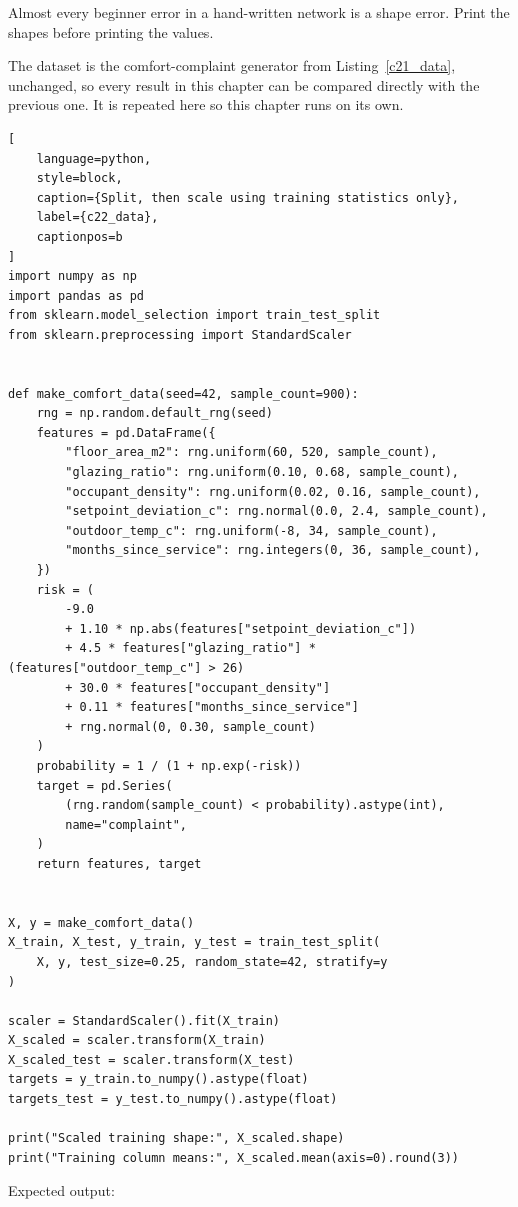 Almost every beginner error in a hand-written network is a shape error. Print the
shapes before printing the values.


The dataset is the comfort-complaint generator from
Listing~\ref{c21_data}, unchanged, so every result in this chapter can be
compared directly with the previous one. It is repeated here so this chapter
runs on its own.

\begin{lstlisting}[
    language=python,
    style=block,
    caption={Split, then scale using training statistics only},
    label={c22_data},
    captionpos=b
]
import numpy as np
import pandas as pd
from sklearn.model_selection import train_test_split
from sklearn.preprocessing import StandardScaler


def make_comfort_data(seed=42, sample_count=900):
    rng = np.random.default_rng(seed)
    features = pd.DataFrame({
        "floor_area_m2": rng.uniform(60, 520, sample_count),
        "glazing_ratio": rng.uniform(0.10, 0.68, sample_count),
        "occupant_density": rng.uniform(0.02, 0.16, sample_count),
        "setpoint_deviation_c": rng.normal(0.0, 2.4, sample_count),
        "outdoor_temp_c": rng.uniform(-8, 34, sample_count),
        "months_since_service": rng.integers(0, 36, sample_count),
    })
    risk = (
        -9.0
        + 1.10 * np.abs(features["setpoint_deviation_c"])
        + 4.5 * features["glazing_ratio"] * (features["outdoor_temp_c"] > 26)
        + 30.0 * features["occupant_density"]
        + 0.11 * features["months_since_service"]
        + rng.normal(0, 0.30, sample_count)
    )
    probability = 1 / (1 + np.exp(-risk))
    target = pd.Series(
        (rng.random(sample_count) < probability).astype(int),
        name="complaint",
    )
    return features, target


X, y = make_comfort_data()
X_train, X_test, y_train, y_test = train_test_split(
    X, y, test_size=0.25, random_state=42, stratify=y
)

scaler = StandardScaler().fit(X_train)
X_scaled = scaler.transform(X_train)
X_scaled_test = scaler.transform(X_test)
targets = y_train.to_numpy().astype(float)
targets_test = y_test.to_numpy().astype(float)

print("Scaled training shape:", X_scaled.shape)
print("Training column means:", X_scaled.mean(axis=0).round(3))
\end{lstlisting}

Expected output:


